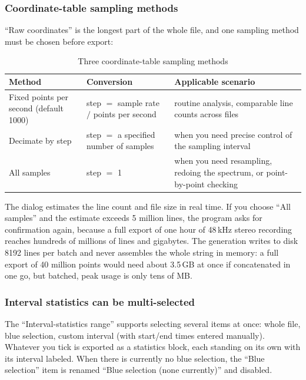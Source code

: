 \documentclass[UTF8,a4paper,12pt]{ctexart}
\begin{document}
\subsubsection*{Coordinate-table sampling methods}

``Raw coordinates'' is the longest part of the whole file, and one sampling method must be chosen before export:

\begin{table}[htbp]
\centering
\caption{Three coordinate-table sampling methods}
\begin{tabular}{@{}>{\raggedright\arraybackslash}p{4.2cm}>{\raggedright\arraybackslash}p{4.0cm}>{\raggedright\arraybackslash}p{5.0cm}@{}}
\toprule
Method & Conversion & Applicable scenario \\
\midrule
Fixed points per second (default 1000) & step $=$ sample rate $/$ points per second & routine analysis, comparable line counts across files \\
Decimate by step & step $=$ a specified number of samples & when you need precise control of the sampling interval \\
All samples & step $=$ 1 & when you need resampling, redoing the spectrum, or point-by-point checking \\
\bottomrule
\end{tabular}
\end{table}

The dialog estimates the line count and file size in real time. If you choose ``All samples'' and the estimate exceeds 5 million lines, the program asks for confirmation again, because a full export of one hour of 48\,kHz stereo recording reaches hundreds of millions of lines and gigabytes. The generation writes to disk 8192 lines per batch and never assembles the whole string in memory: a full export of 40 million points would need about 3.5\,GB at once if concatenated in one go, but batched, peak usage is only tens of MB.

\subsubsection*{Interval statistics can be multi-selected}

The ``Interval-statistics range'' supports selecting several items at once: whole file, blue selection, custom interval (with start/end times entered manually). Whatever you tick is exported as a statistics block, each standing on its own with its interval labeled. When there is currently no blue selection, the ``Blue selection'' item is renamed ``Blue selection (none currently)'' and disabled.
\end{document}
